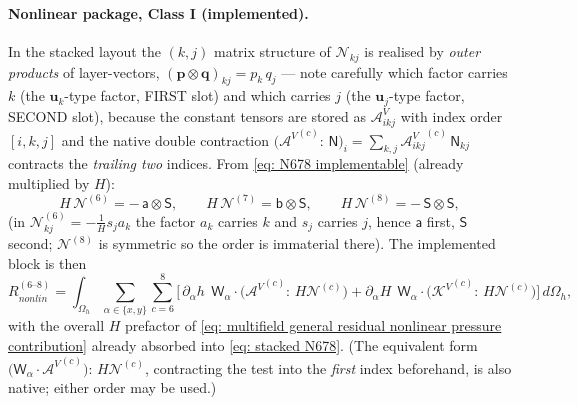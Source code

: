 \documentclass{article}
\newcommand{\uj}{\mathbf{u}_j}
\newcommand{\uk}{\mathbf{u}_k}
\newcommand{\VAikj}{\boldsymbol{\mathcal{A}}_{ikj}^V}
\newcommand{\VtA}{\boldsymbol{\mathcal{A}}^V}
\newcommand{\VtK}{\boldsymbol{\mathcal{K}}^V}
\newcommand{\Oh}{\Omega_h}
\begin{document}
\paragraph{Nonlinear package, Class I (implemented).} In the stacked layout the $(k,j)$ matrix structure of $\mathcal{N}_{kj}$ is realised by \emph{outer products} of layer-vectors, $(\mathbf{p}\otimes\mathbf{q})_{kj} = p_k\, q_j$ — note carefully which factor carries $k$ (the $\uk$-type factor, FIRST slot) and which carries $j$ (the $\uj$-type factor, SECOND slot), because the constant tensors are stored as $\VAikj$ with index order $[i,k,j]$ and the native double contraction $\big({\VtA}^{(c)} \boldsymbol{:}\, \mathsf{N}\big)_i = \sum_{k,j} {\VAikj}^{(c)}\, \mathsf{N}_{kj}$ contracts the \emph{trailing two} indices. From \eqref{eq: N678 implementable} (already multiplied by $H$):
\begin{equation}
    H\,\mathcal{N}^{(6)} = -\,\mathsf{a}\otimes\mathsf{S}, \qquad
    H\,\mathcal{N}^{(7)} = \mathsf{b}\otimes\mathsf{S}, \qquad
    H\,\mathcal{N}^{(8)} = -\,\mathsf{S}\otimes\mathsf{S},
    \label{eq: stacked N678}
\end{equation}
(in $\mathcal{N}^{(6)}_{kj} = -\frac1H s_j a_k$ the factor $a_k$ carries $k$ and $s_j$ carries $j$, hence $\mathsf{a}$ first, $\mathsf{S}$ second; $\mathcal{N}^{(8)}$ is symmetric so the order is immaterial there). The implemented block is then
\begin{equation}
    R_{nonlin}^{(6\text{--}8)} = \int_{\Oh} \sum_{\alpha\in\{x,y\}} \sum_{c=6}^{8}
    \Big[\, \partial_\alpha h\;\, \mathsf{W}_\alpha\!\cdot\!\big({\VtA}^{(c)} \boldsymbol{:}\, H\mathcal{N}^{(c)}\big)
    + \partial_\alpha H\;\, \mathsf{W}_\alpha\!\cdot\!\big({\VtK}^{(c)} \boldsymbol{:}\, H\mathcal{N}^{(c)}\big) \Big]\, d\Oh ,
    \label{eq: stacked Rnl68}
\end{equation}
with the overall $H$ prefactor of \eqref{eq: multifield general residual nonlinear pressure contribution} already absorbed into \eqref{eq: stacked N678}. (The equivalent form $\big(\mathsf{W}_\alpha\cdot{\VtA}^{(c)}\big)\boldsymbol{:}\,H\mathcal{N}^{(c)}$, contracting the test into the \emph{first} index beforehand, is also native; either order may be used.)
\end{document}
